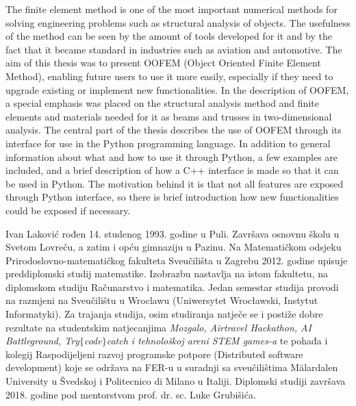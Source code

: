 \documentclass[a4paper,twoside,12pt]{memoir} %
\begin{document}
\begin{summary}
The finite element method is one of the most important numerical methods for solving engineering problems such as structural analysis of objects. The usefulness of the method can be seen by the amount of tools developed for it and by the fact that it became standard in industries such as aviation and automotive. The aim of this thesis was to present OOFEM (Object Oriented Finite Element Method), enabling future users to use it more easily, especially if they need to upgrade existing or implement new functionalities. In the description of OOFEM, a special emphasis was placed on the structural analysis method and finite elements and materials needed for it as beams and trusses in two-dimensional analysis. The central part of the thesis describes the use of OOFEM through its interface for use in the Python programming language. In addition to general information about what and how to use it through Python, a few examples are included, and a brief description of how a C++ interface is made so that it can be used in Python. The motivation behind it is that not all features are exposed through Python interface, so there is brief introduction how new functionalities could be exposed if necessary.
\end{summary}


\begin{cv}
Ivan Laković rođen 14. studenog 1993. godine u Puli. Završava osnovnu školu u Svetom Lovreču, a zatim i opću gimnaziju u Pazinu. Na Matematičkom odsjeku Prirodoslovno-matematičkog fakulteta Sveučilišta u Zagrebu 2012. godine upisuje preddiplomski studij matematike. Izobrazbu nastavlja na istom fakultetu, na diplomskom studiju Računarstvo i matematika. Jedan semestar studija provodi na razmjeni na Sveučilištu u Wroclawu (Uniwersytet Wrocławski, Instytut Informatyki). Za trajanja studija, osim studiranja natječe se i postiže dobre rezultate na studentskim natjecanjima \textit{Mozgalo, Airtravel Hackathon, AI Battleground, Try$\{$code$\}$catch i tehnološkoj areni STEM games-a} te pohađa i kolegij Raspodijeljeni razvoj programske potpore (Distributed software development) koje se održava na FER-u u suradnji sa sveučilištima Mälardalen University u Švedskoj i Politecnico di Milano u Italiji. Diplomski studiji završava 2018. godine pod mentorstvom prof. dr. sc. Luke Grubišića.
\end{cv}
\end{document}
